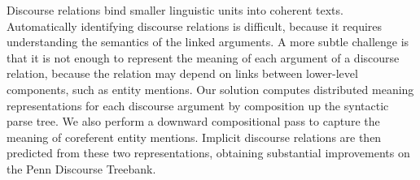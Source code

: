Discourse relations bind smaller linguistic units into coherent texts. Automatically identifying discourse relations is difficult, because it requires understanding the semantics of the linked arguments. A more subtle challenge is that it is not enough to represent the meaning of each argument of a discourse relation, because the relation may depend on links between lower-level components, such as entity mentions. Our solution computes distributed meaning representations for each discourse argument by composition up the syntactic parse tree. We also perform a downward compositional pass to capture the meaning of coreferent entity mentions. Implicit discourse relations are then predicted from these two representations, obtaining substantial improvements on the Penn Discourse Treebank.
